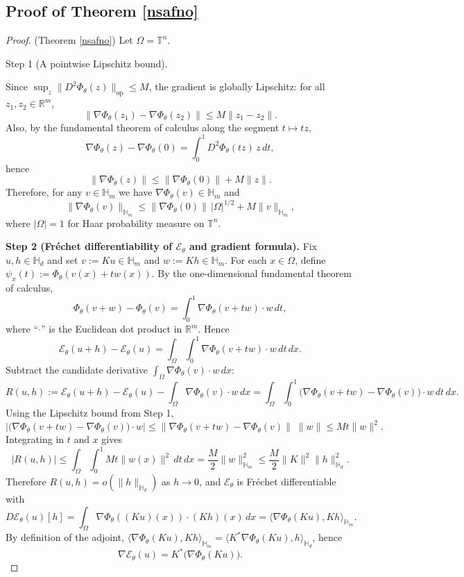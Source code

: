 \documentclass{article}
\theoremstyle{plain}
\theoremstyle{definition}
\theoremstyle{remark}
\newcommand{\inner}[2]{\langle #1, #2 \rangle}
\newcommand{\Hd}{\mathbb{H}_d}
\newcommand{\Hm}{\mathbb{H}_m}
\begin{document}
\subsection{Proof of Theorem \ref{nsafno}}
\begin{proof}(Theorem \ref{nsafno})
Let $\Omega=\mathbb{T}^n$.

Step 1 (A pointwise Lipschitz bound).

Since $\sup_{z}\|D^2\Phi_\theta(z)\|_{\mathrm{op}}\le M$, the gradient is globally Lipschitz:
for all $z_1,z_2\in\mathbb{R}^m$,
\[
\|\nabla\Phi_\theta(z_1)-\nabla\Phi_\theta(z_2)\|
\le M\|z_1-z_2\|.
\]
Also, by the fundamental theorem of calculus along the segment $t\mapsto tz$,
\[
\nabla\Phi_\theta(z)-\nabla\Phi_\theta(0)
=\int_0^1 D^2\Phi_\theta(tz)\,z\,dt,
\]
hence
\[
\|\nabla\Phi_\theta(z)\|\le \|\nabla\Phi_\theta(0)\| + M\|z\|.
\]
Therefore, for any $v\in \Hm$ we have $\nabla\Phi_\theta(v)\in \Hm$ and
\[
\|\nabla\Phi_\theta(v)\|_{\Hm}
\le \|\nabla\Phi_\theta(0)\|\,|\Omega|^{1/2} + M\|v\|_{\Hm},
\]
where $|\Omega|=1$ for Haar probability measure on $\mathbb{T}^n$.

\textbf{Step 2 (Fr\'echet differentiability of $\mathcal{E}_\theta$ and gradient formula).}
Fix $u,h\in\Hd$ and set $v:=Ku\in\Hm$ and $w:=Kh\in\Hm$.
For each $x\in\Omega$, define $\psi_x(t):=\Phi_\theta(v(x)+t w(x))$.
By the one-dimensional fundamental theorem of calculus,
\[
\Phi_\theta(v+w)-\Phi_\theta(v)
=\int_0^1 \nabla\Phi_\theta(v+t w)\cdot w\,dt,
\]
where ``$\cdot$'' is the Euclidean dot product in $\mathbb{R}^m$.
Hence
\[
\mathcal{E}_\theta(u+h)-\mathcal{E}_\theta(u)
=\int_\Omega\int_0^1 \nabla\Phi_\theta(v+t w)\cdot w\,dt\,dx.
\]
Subtract the candidate derivative $\int_\Omega \nabla\Phi_\theta(v)\cdot w\,dx$:
\[
R(u,h)
:=\mathcal{E}_\theta(u+h)-\mathcal{E}_\theta(u)-\int_\Omega \nabla\Phi_\theta(v)\cdot w\,dx
=\int_\Omega\int_0^1\big(\nabla\Phi_\theta(v+t w)-\nabla\Phi_\theta(v)\big)\cdot w\,dt\,dx.
\]
Using the Lipschitz bound from Step 1,
\[
\big|\big(\nabla\Phi_\theta(v+t w)-\nabla\Phi_\theta(v)\big)\cdot w\big|
\le \|\nabla\Phi_\theta(v+t w)-\nabla\Phi_\theta(v)\|\;\|w\|
\le M t \|w\|^2.
\]
Integrating in $t$ and $x$ gives
\[
|R(u,h)|
\le \int_\Omega\int_0^1 M t \|w(x)\|^2\,dt\,dx
=\frac{M}{2}\|w\|_{\Hm}^2
\le \frac{M}{2}\|K\|^2\|h\|_{\Hd}^2.
\]
Therefore $R(u,h)=o(\|h\|_{\Hd})$ as $h\to 0$, and $\mathcal{E}_\theta$ is Fr\'echet differentiable with
\[
D\mathcal{E}_\theta(u)[h]=\int_\Omega \nabla\Phi_\theta((Ku)(x))\cdot (Kh)(x)\,dx
=\inner{\nabla\Phi_\theta(Ku)}{Kh}_{\Hm}.
\]
By definition of the adjoint, $\inner{\nabla\Phi_\theta(Ku)}{Kh}_{\Hm}
=\inner{K^*\nabla\Phi_\theta(Ku)}{h}_{\Hd}$, hence
\[
\nabla\mathcal{E}_\theta(u)=K^*\big(\nabla\Phi_\theta(Ku)\big).
\]


\end{proof}
\end{document}
